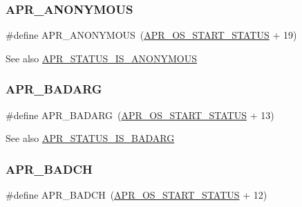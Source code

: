 \subsubsection{\texorpdfstring{A\+P\+R\+\_\+\+A\+N\+O\+N\+Y\+M\+O\+US}{APR\_ANONYMOUS}}
{\footnotesize\ttfamily \#define A\+P\+R\+\_\+\+A\+N\+O\+N\+Y\+M\+O\+US~(\mbox{\hyperlink{group__apr__errno_ga450e1a5734732e092ddaa5b67414f69b}{A\+P\+R\+\_\+\+O\+S\+\_\+\+S\+T\+A\+R\+T\+\_\+\+S\+T\+A\+T\+US}} + 19)}

\begin{DoxySeeAlso}{See also}
\mbox{\hyperlink{group___a_p_r___s_t_a_t_u_s___i_s_gabf2969f69ac131cb06178c0809abf943}{A\+P\+R\+\_\+\+S\+T\+A\+T\+U\+S\+\_\+\+I\+S\+\_\+\+A\+N\+O\+N\+Y\+M\+O\+US}} 
\end{DoxySeeAlso}
\mbox{\label{group___a_p_r___error_ga771bf48ab38d93355be8530f6efe4ae9}} 
\subsubsection{\texorpdfstring{A\+P\+R\+\_\+\+B\+A\+D\+A\+RG}{APR\_BADARG}}
{\footnotesize\ttfamily \#define A\+P\+R\+\_\+\+B\+A\+D\+A\+RG~(\mbox{\hyperlink{group__apr__errno_ga450e1a5734732e092ddaa5b67414f69b}{A\+P\+R\+\_\+\+O\+S\+\_\+\+S\+T\+A\+R\+T\+\_\+\+S\+T\+A\+T\+US}} + 13)}

\begin{DoxySeeAlso}{See also}
\mbox{\hyperlink{group___a_p_r___s_t_a_t_u_s___i_s_ga88b31c127ad48d12353d175926913cb3}{A\+P\+R\+\_\+\+S\+T\+A\+T\+U\+S\+\_\+\+I\+S\+\_\+\+B\+A\+D\+A\+RG}} 
\end{DoxySeeAlso}
\mbox{\label{group___a_p_r___error_ga6f3ca71069880d9fe5678687a257d616}} 
\subsubsection{\texorpdfstring{A\+P\+R\+\_\+\+B\+A\+D\+CH}{APR\_BADCH}}
{\footnotesize\ttfamily \#define A\+P\+R\+\_\+\+B\+A\+D\+CH~(\mbox{\hyperlink{group__apr__errno_ga450e1a5734732e092ddaa5b67414f69b}{A\+P\+R\+\_\+\+O\+S\+\_\+\+S\+T\+A\+R\+T\+\_\+\+S\+T\+A\+T\+US}} + 12)}

